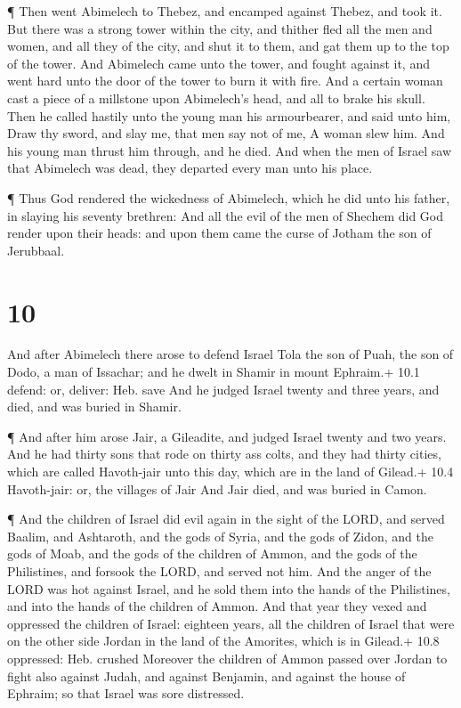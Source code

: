  ¶ Then went Abimelech to Thebez, and encamped against
Thebez, and took it.  But there was a strong tower within
the city, and thither fled all the men and women, and all they of the
city, and shut it to them, and gat them up to the top of the tower.
 And Abimelech came unto the tower, and fought against it,
and went hard unto the door of the tower to burn it with fire.
 And a certain woman cast a piece of a millstone upon
Abimelech's head, and all to brake his skull.  Then he
called hastily unto the young man his armourbearer, and said unto him,
Draw thy sword, and slay me, that men say not of me, A woman slew him.
And his young man thrust him through, and he died.  And
when the men of Israel saw that Abimelech was dead, they departed every
man unto his place.

 ¶ Thus God rendered the wickedness of Abimelech, which he
did unto his father, in slaying his seventy brethren:  And
all the evil of the men of Shechem did God render upon their heads: and
upon them came the curse of Jotham the son of Jerubbaal.

\hypertarget{section-9}{%
\section{10}\label{section-9}}

 And after Abimelech there arose to defend Israel Tola the
son of Puah, the son of Dodo, a man of Issachar; and he dwelt in Shamir
in mount Ephraim.+ 10.1 defend: or, deliver: Heb. save  And
he judged Israel twenty and three years, and died, and was buried in
Shamir.

 ¶ And after him arose Jair, a Gileadite, and judged Israel
twenty and two years.  And he had thirty sons that rode on
thirty ass colts, and they had thirty cities, which are called
Havoth-jair unto this day, which are in the land of Gilead.+ 10.4
Havoth-jair: or, the villages of Jair  And Jair died, and
was buried in Camon.

 ¶ And the children of Israel did evil again in the sight of
the LORD, and served Baalim, and Ashtaroth, and the gods of Syria, and
the gods of Zidon, and the gods of Moab, and the gods of the children of
Ammon, and the gods of the Philistines, and forsook the LORD, and served
not him.  And the anger of the LORD was hot against Israel,
and he sold them into the hands of the Philistines, and into the hands
of the children of Ammon.  And that year they vexed and
oppressed the children of Israel: eighteen years, all the children of
Israel that were on the other side Jordan in the land of the Amorites,
which is in Gilead.+ 10.8 oppressed: Heb. crushed  Moreover
the children of Ammon passed over Jordan to fight also against Judah,
and against Benjamin, and against the house of Ephraim; so that Israel
was sore distressed.


